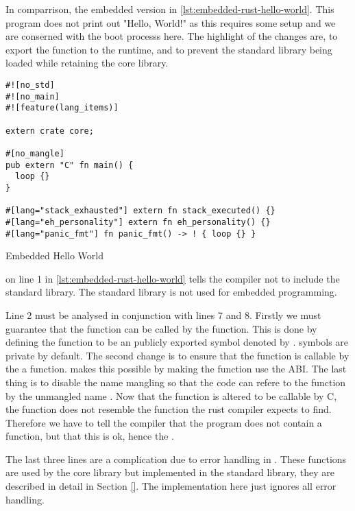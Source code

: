 In comparrison, the embedded version in \autoref{lst:embedded-rust-hello-world}.
This program does not print out "Hello, World!" as this requires some setup and we are conserned with the boot processs here.
The highlight of the changes are, to export the {\main} function to the {\C} runtime, and to prevent the standard library being loaded while retaining the core library.

\begin{listing}[H]
\begin{verbatim}
#![no_std]
#![no_main]
#![feature(lang_items)]

extern crate core;

#[no_mangle]
pub extern "C" fn main() {
  loop {}
}

#[lang="stack_exhausted"] extern fn stack_executed() {}
#[lang="eh_personality"] extern fn eh_personality() {}
#[lang="panic_fmt"] fn panic_fmt() -> ! { loop {} }
\end{verbatim}
\caption{Embedded Hello World}
\label{lst:embedded-rust-hello-world}
\end{listing}

\attrib{\#\![no\_std]} on line 1 in \autoref{lst:embedded-rust-hello-world} tells the {\rust} compiler not to include the standard library.
The standard library is not used for embedded programming. 

Line 2 must be analysed in conjunction with lines 7 and 8.
Firstly we must guarantee that the function can be called by the  function.
This is done by defining the {\main} function to be an publicly exported symbol denoted by .
\rust symbols are private by default.
The second change is to ensure that the function is callable by the a {\C} function.
 makes this possible by making the function use the {\C} ABI. 
The last thing is to disable the {\rust} name mangling so that the {\C} code can refere to the function by the unmangled name {\main}.
Now that the {\main} function is altered to be callable by C, the function does not resemble the function the rust compiler expects to find.
Therefore we have to tell the compiler that the program does not contain a {\main} function, but that this is ok, hence the \attrib{\#\![no\_main]}.

The last three lines are a complication due to error handling in {\rust}.
These functions are used by the core library but implemented in the standard library, they are described in detail in Section \ref{}. 
The implementation here just ignores all error handling.

